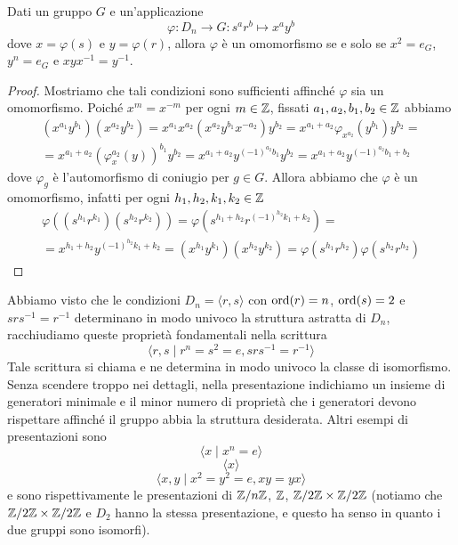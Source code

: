 \documentclass[11pt]{scrartcl}
\begin{document}
\begin{proposition}
    Dati un gruppo $G$ e un'applicazione
    \[
        \varphi:D_n\longrightarrow G :s^ar^b \longmapsto x^ay^b
    \]dove $x = \varphi(s)$ e $y = \varphi(r)$, allora $\varphi$ è un omomorfismo
    se e solo se $x^2 = e_G$, $y^n = e_G$ e $xyx^{-1} = y^{-1}$.
\end{proposition}

\begin{proof}
    Mostriamo che tali condizioni sono sufficienti affinché $\varphi$ sia un 
    omomorfismo. Poiché $x^m = x^{-m}$ per ogni $m \in \mathbb Z$, fissati 
    $a_1, a_2, b_1, b_2 \in \mathbb Z$ abbiamo 
    \begin{multline*}
        (x^{a_1}y^{b_1})(x^{a_2}y^{b_2}) = x^{a_1}x^{a_2}(x^{a_2}y^{b_1}x^{-a_2})y^{b_2} = 
        x^{a_1 + a_2}\varphi_{x^{a_2}}(y^{b_1})y^{b_2} = \\
        = x^{a_1 + a_2} (\varphi_x^{a_2}(y))^{b_1}y^{b_2} =
        x^{a_1 + a_2}y^{(-1)^{a_2}b_1}y^{b_2} = x^{a_1 + a_2}y^{(-1)^{a_2}b_1 + b_2}
    \end{multline*}dove $\varphi_g$ è l'automorfismo di coniugio per $g \in G$.
    Allora abbiamo che $\varphi$ è un omomorfismo, infatti per ogni $h_1, h_2, k_1, k_2 \in \mathbb Z$
    \begin{multline*}
        \varphi((s^{h_1}r^{k_1})(s^{h_2}r^{k_2})) = \varphi(s^{h_1 + h_2}r^{(-1)^{h_2}k_1 + k_2}) =\\
        = x^{h_1 + h_2}y^{(-1)^{h_2}k_1 + k_2} = (x^{h_1}y^{k_1})(x^{h_2}y^{k_2}) = 
        \varphi(s^{h_1}r^{h_2})\varphi(s^{h_2}r^{h_2})
    \end{multline*}
\end{proof}

\begin{remark}
    Abbiamo visto che le condizioni $D_n = \langle r, s\rangle$ con $\operatorname{ord}(r) = n$,
    $\operatorname{ord}(s) = 2$ e $srs^{-1} = r^{-1}$ determinano in modo univoco 
    la struttura astratta di $D_n$, racchiudiamo queste proprietà fondamentali
    nella scrittura
    \[
        \langle r, s\mid r^n = s^2 = e, srs^{-1} = r^{-1}\rangle
    \]
    Tale scrittura si chiama  e ne determina 
    in modo univoco la classe di isomorfismo. Senza scendere troppo nei dettagli,
    nella presentazione indichiamo un insieme di generatori minimale e il 
    minor numero di proprietà che i generatori devono rispettare affinché il 
    gruppo abbia la struttura desiderata. Altri esempi di presentazioni sono
    \[
        \langle x \mid x^n = e\rangle
    \]
    \[
        \langle x\rangle
    \]
    \[
        \langle x, y \mid x^2 = y^2 = e, xy = yx\rangle
    \]
    e sono rispettivamente le presentazioni di ${\mathbb Z}/n{\mathbb Z}$, $\mathbb Z$, $\mathbb{Z}/{2}\mathbb{Z}\times\mathbb{Z}/{2}\mathbb{Z}$
    (notiamo che $\mathbb{Z}/{2}\mathbb{Z}\times\mathbb{Z}/{2}\mathbb{Z}$ e $D_2$ hanno la stessa presentazione,
    e questo ha senso in quanto i due gruppi sono isomorfi).
\end{remark}
\end{document}
